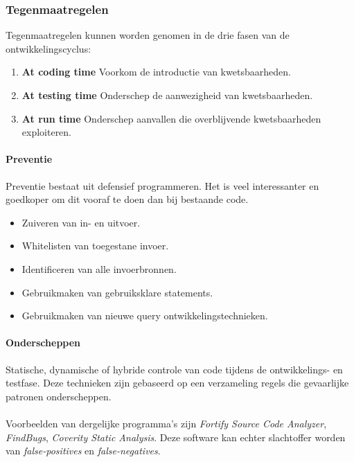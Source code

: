 \documentclass[../main.tex]{subfiles}
\begin{document}
\subsubsection{Tegenmaatregelen}
Tegenmaatregelen kunnen worden genomen in de drie fasen van de ontwikkelingscyclus:
\begin{enumerate}
	\item \textbf{At coding time} Voorkom de introductie van kwetsbaarheden.
	\item \textbf{At testing time} Onderschep de aanwezigheid van kwetsbaarheden.
	\item \textbf{At run time} Onderschep aanvallen die overblijvende kwetsbaarheden exploiteren.
\end{enumerate}

\paragraph{Preventie} Preventie bestaat uit defensief programmeren. Het is veel interessanter en goedkoper om dit vooraf te doen dan bij bestaande code.
\begin{itemize}
	\item Zuiveren van in- en uitvoer. 
	\item Whitelisten van toegestane invoer.
	\item Identificeren van alle invoerbronnen.
	\item Gebruikmaken van gebruiksklare statements.
	\item Gebruikmaken van nieuwe query ontwikkelingstechnieken.
\end{itemize}

\paragraph{Onderscheppen} Statische, dynamische of hybride controle van code tijdens de ontwikkelings- en testfase. Deze technieken zijn gebaseerd op een verzameling regels die gevaarlijke patronen onderscheppen.
\\\\
Voorbeelden van dergelijke programma's zijn \textit{Fortify Source Code Analyzer}, \textit{FindBugs}, \textit{Coverity Static Analysis}. Deze software kan echter slachtoffer worden van \textit{false-positives} en \textit{false-negatives}.
\end{document}
